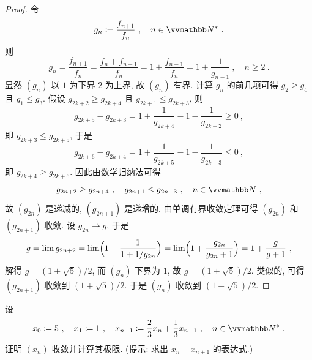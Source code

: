 \begin{proof}
    令
    \[
        g_n \coloneqq \frac{f_{n + 1}}{f_n}\ ,\quad n \in \N^\ast\ .
    \]
    则
    \[
        g_n = \frac{f_{n + 1}}{f_n} = \frac{f_n + f_{n - 1}}{f_n} = 1 + \frac{f_{n - 1}}{f_n} = 1 + \frac{1}{g_{n - 1}}\ ,\quad n \geq 2\ .
    \]
    显然 \((g_n)\) 以 \(1\) 为下界 \(2\) 为上界, 故 \((g_n)\) 有界. 计算 \(g_n\) 的前几项可得 \(g_2 \geq g_4\) 且 \(g_1 \leq g_3\). 假设 \(g_{2 k + 2} \geq g_{2 k + 4}\) 且 \(g_{2 k + 1} \leq g_{2 k + 3}\), 则
    \[
        g_{2 k + 5} - g_{2 k + 3} = 1 + \frac{1}{g_{2 k + 4}} - 1 - \frac{1}{g_{2 k + 2}} \geq 0\ ,
    \]
    即 \(g_{2 k + 3} \leq g_{2 k + 5}\), 于是
    \[
        g_{2 k + 6} - g_{2 k + 4} = 1 + \frac{1}{g_{2 k + 5}} - 1 - \frac{1}{g_{2 k + 3}} \leq 0\ ,
    \]
    即 \(g_{2 k + 4} \geq g_{2 k + 6}\). 因此由数学归纳法可得
    \[
        g_{2 n + 2} \geq g_{2 n + 4}\ ,\quad g_{2 n + 1} \leq g_{2 n + 3}\ ,\quad n \in \N\ ,
    \]
    故 \((g_{2 n})\) 是递减的, \((g_{2 n + 1})\) 是递增的. 由单调有界收敛定理可得 \((g_{2 n})\) 和 \((g_{2 n + 1})\) 收敛. 设 \(g_{2 n} \to g\), 于是
    \[
        g = \lim g_{2 n + 2} = \lim \Bigl(1 + \frac{1}{1 + 1 / g_{2 n}}\Bigr) = \lim \Bigl(1 + \frac{g_{2 n}}{g_{2 n} + 1}\Bigr) = 1 + \frac{g}{g + 1}\ ,
    \]
    解得 \(g = (1 \pm \sqrt{5}) / 2\), 而 \((g_n)\) 下界为 \(1\), 故 \(g = (1 + \sqrt{5}) / 2\). 类似的, 可得 \((g_{2 n + 1})\) 收敛到 \((1 + \sqrt{5}) / 2\). 于是 \((g_n)\) 收敛到 \((1 + \sqrt{5}) / 2\).
\end{proof}

\begin{exercise}
    设
    \[
        x_0 \coloneqq 5\ ,\quad x_1 \coloneqq 1\ ,\quad x_{n + 1} \coloneqq \frac{2}{3} x_n + \frac{1}{3} x_{n - 1}\ ,\quad n \in \N^\ast\ .
    \]
    证明 \((x_n)\) 收敛并计算其极限. (提示: 求出 \(x_n - x_{n + 1}\) 的表达式.)
\end{exercise}

